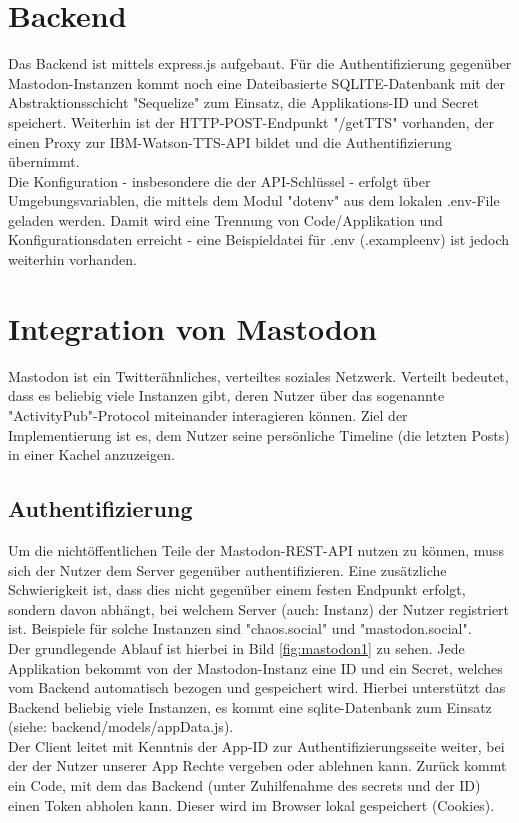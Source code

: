 \documentclass[fleqn,10pt]{SelfArx} %
\begin{document}
\section{Backend}
Das Backend ist mittels express.js aufgebaut. Für die Authentifizierung gegenüber Mastodon-Instanzen kommt noch eine Dateibasierte SQLITE-Datenbank mit der Abstraktionsschicht "Sequelize" zum Einsatz, die Applikations-ID und Secret speichert. Weiterhin ist der HTTP-POST-Endpunkt "/getTTS" vorhanden, der einen Proxy zur IBM-Watson-TTS-API bildet und die Authentifizierung übernimmt. \\
Die Konfiguration - insbesondere die der API-Schlüssel - erfolgt über Umgebungsvariablen, die mittels dem Modul "dotenv" aus dem lokalen .env-File geladen werden. Damit wird eine Trennung von Code/Applikation und Konfigurationsdaten erreicht - eine Beispieldatei für .env (.exampleenv) ist jedoch weiterhin vorhanden.
\section{Integration von Mastodon}
Mastodon ist ein Twitterähnliches, verteiltes soziales Netzwerk. Verteilt bedeutet, dass es beliebig viele Instanzen gibt, deren Nutzer über das sogenannte "ActivityPub"-Protocol miteinander interagieren können. Ziel der Implementierung ist es, dem Nutzer seine persönliche Timeline (die letzten Posts) in einer Kachel anzuzeigen.
\subsection{Authentifizierung}
Um die nichtöffentlichen Teile der Mastodon-REST-API nutzen zu können, muss sich der Nutzer dem Server gegenüber authentifizieren. Eine zusätzliche Schwierigkeit ist, dass dies nicht gegenüber einem festen Endpunkt erfolgt, sondern davon abhängt, bei welchem Server (auch: Instanz) der Nutzer registriert ist. Beispiele für solche Instanzen sind "chaos.social" und "mastodon.social". \\
Der grundlegende Ablauf ist hierbei in Bild \ref{fig:mastodon1} zu sehen. Jede Applikation bekommt von der Mastodon-Instanz eine ID und ein Secret, welches vom Backend automatisch bezogen und gespeichert wird. Hierbei unterstützt das Backend beliebig viele Instanzen, es kommt eine sqlite-Datenbank zum Einsatz (siehe: backend/models/appData.js).\\ Der Client leitet mit Kenntnis der App-ID zur Authentifizierungsseite weiter, bei der der Nutzer unserer App Rechte vergeben oder ablehnen kann. Zurück kommt ein Code, mit dem das Backend (unter Zuhilfenahme des secrets und der ID) einen Token abholen kann. Dieser wird im Browser lokal gespeichert (Cookies).
\end{document}
